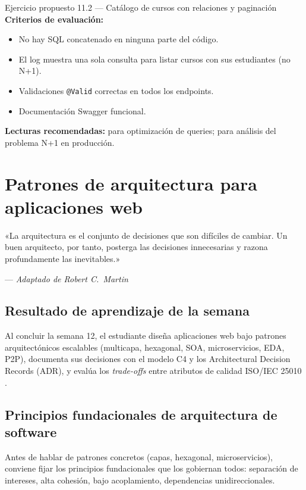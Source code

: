 \begin{cajaejercicio}{Ejercicio propuesto 11.2 --- Catálogo de cursos con relaciones y paginación}
\textbf{Criterios de evaluación:}
\begin{itemize}
\item No hay SQL concatenado en ninguna parte del código.
\item El log muestra una sola consulta para listar cursos con sus
estudiantes (no N+1).
\item Validaciones \texttt{@Valid} correctas en todos los endpoints.
\item Documentación Swagger funcional.
\end{itemize}

\textbf{Lecturas recomendadas:} \cite{ottinger2017hibernate} para
optimización de queries; \cite{ottinger2017hibernate} para análisis del
problema N+1 en producción.
\end{cajaejercicio}

\chapter{Patrones de arquitectura para aplicaciones web}
\label{cap:semana12}

\epigraph{«La arquitectura es el conjunto de decisiones que son
difíciles de cambiar. Un buen arquitecto, por tanto, posterga las
decisiones innecesarias y razona profundamente las inevitables.»}
{--- \textit{Adaptado de Robert C.~Martin}}

\section*{Resultado de aprendizaje de la semana}
Al concluir la semana 12, el estudiante diseña aplicaciones web bajo
patrones arquitectónicos escalables (multicapa, hexagonal, SOA,
microservicios, EDA, P2P), documenta sus decisiones con el modelo C4
\cite{brown2023c4} y los Architectural Decision Records (ADR), y
evalúa los \emph{trade-offs} entre atributos de calidad ISO/IEC 25010
\cite{iso25010}.

\section{Principios fundacionales de arquitectura de software}

Antes de hablar de patrones concretos (capas, hexagonal,
microservicios), conviene fijar los principios fundacionales que los
gobiernan todos: separación de intereses, alta cohesión, bajo
acoplamiento, dependencias unidireccionales.


